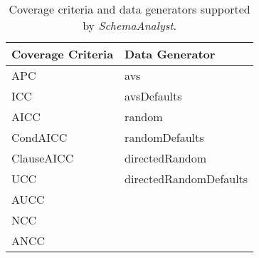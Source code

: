 \begin{table}[]
\centering
\caption{Coverage criteria and data generators supported by \textit{SchemaAnalyst}.}
\label{tab:args}
\begin{tabular}{l|l}
\multicolumn{1}{c|}{Coverage Criteria} & Data Generator         \\ \hline
APC                                    & avs                    \\
ICC                                    & avsDefaults            \\
AICC                                   & random                 \\
CondAICC                               & randomDefaults         \\
ClauseAICC                             & directedRandom         \\
UCC                                    & directedRandomDefaults \\
AUCC                                   &                        \\
NCC                                    &                        \\
ANCC                                   &                       
\end{tabular}
\end{table}
